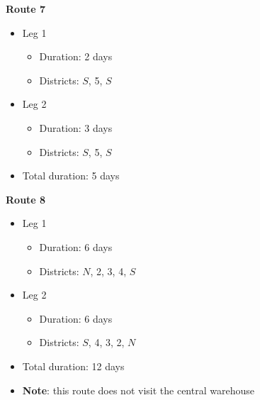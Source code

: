 \documentclass[10pt]{article}
\begin{document}
\hfill

\begin{minipage}[t]{0.3\textwidth}
    \textbf{Route 7}
    \begin{itemize}
        \item Leg 1
        \begin{itemize}
            \item Duration: 2 days 
            \item Districts: $S $, 5, $S $
        \end{itemize}
        \item Leg 2
        \begin{itemize}
            \item Duration: 3 days 
            \item Districts: $S $, 5, $S $
        \end{itemize}
        \item Total duration: 5 days
    \end{itemize}
\end{minipage}
\hfill
\begin{minipage}[t]{0.3\textwidth}
    \textbf{Route 8}
    \begin{itemize}
        \item Leg 1
        \begin{itemize}
            \item Duration: 6 days 
            \item Districts: $N $, 2, 3, 4, $S $
        \end{itemize}
        \item Leg 2
        \begin{itemize}
            \item Duration: 6 days 
            \item Districts: $S $, 4, 3, 2, $N $
        \end{itemize}
        \item Total duration: 12 days
        \item \textbf{Note}: this route does not visit the central warehouse
    \end{itemize}
\end{minipage}
\hfill
\end{document}
